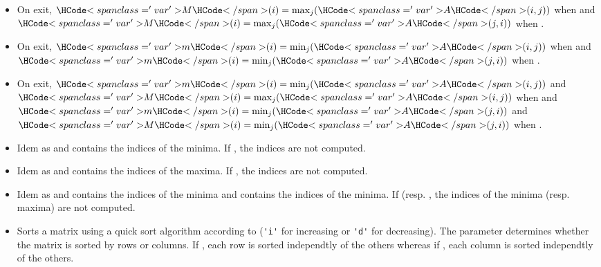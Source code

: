 \begin{itemize}
\item {}
  \sshortdescribe On exit, $\var{M}(i) = \max_{j}(\var{A}(i, j))$ when 
  and $\var{M}(i) = \max_{j}(\var{A}(j, i))$ when .

\item {}
  \sshortdescribe On exit, $\var{m}(i) = \min_{j}(\var{A}(i, j))$ when 
  and $\var{m}(i) = \min_{j}(\var{A}(j, i))$ when .

\item {}
  \sshortdescribe On exit, $\var{m}(i) = \min_{j}(\var{A}(i, j))$ and $\var{M}(i) =
  \max_{j}(\var{A}(i, j))$ when  and $\var{m}(i) = \min_{j}(\var{A}(j, i))$
  and $\var{M}(i) = \min_{j}(\var{A}(j, i))$ when .
  
\item {}
  \sshortdescribe Idem as  and  contains the
  indices of the minima. If , the indices are not computed.

\item {}
  \sshortdescribe Idem as  and  contains the
  indices of the maxima. If , the indices are not computed.

\item {}
  \sshortdescribe Idem as  and  contains the
  indices of the minima and  contains the indices of the minima. If
   (resp. , the indices of the minima
  (resp. maxima) are not computed.

\item {}
  \sshortdescribe Sorts a matrix using a quick sort algorithm according to
   (\verb!'i'! for increasing or \verb!'d'! for decreasing). The parameter  determines
  whether the matrix is sorted by rows or columns. If , each row
  is sorted independtly of the others whereas if , each column
  is sorted independtly of the others.


\end{itemize}
